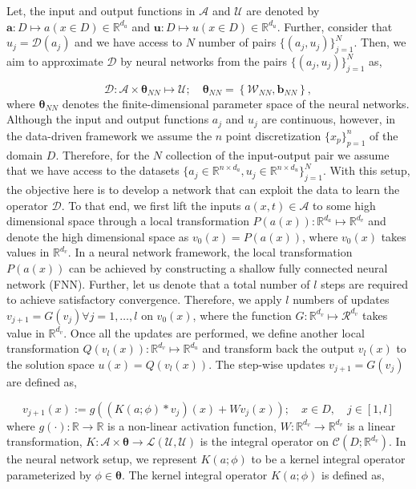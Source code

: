 \documentclass{article}
\begin{document}
Let, the input and output functions in $\mathcal{A}$ and $\mathcal{U}$ are denoted by ${\bm{a}} : D \mapsto a(x \in D) \in \mathbb{R}^{d_a}$ and ${\bm{u}}: D \mapsto u(x \in D) \in \mathbb{R}^{d_u}$. Further, consider that $u_j = \mathcal{D}(a_j)$ and we have access to $N$ number of pairs $\{(a_j, u_j)\}_{j=1}^N$. Then, we aim to approximate $\mathcal{D}$ by neural networks from the pairs $\{(a_j, u_j)\}_{j=1}^N$ as,

\begin{equation}
    \mathcal{D} : \mathcal{A} \times {\bm{\theta}}_{NN} \mapsto \mathcal{U}; \quad {\bm{\theta}_{NN}} = \left\{ \mathcal{W}_{NN}, {\bm{b}}_{NN} \right\},
\end{equation}
where ${\bm{\theta}_{NN}}$ denotes the finite-dimensional parameter space of the neural networks. 
Although the input and output functions $a_{j}$ and $u_{j}$ are continuous, however, in the data-driven framework we assume the $n$ point discretization $\{x_p\}_{p=1}^n$ of the domain $D$. Therefore, for the $N$ collection of the input-output pair we assume that we have access to the datasets $\{ a_{j} \in \mathbb{R}^{n \times d_{a}}, u_{j} \in \mathbb{R}^{n \times d_{u}} \}_{j=1}^N$. With this setup, the objective here is to develop a network that can exploit the data to learn the operator $\mathcal D$. To that end, 
we first lift the inputs $a(x,t) \in \mathcal{A}$ to some high dimensional space through a local transformation $P(a(x)): \mathbb{R}^{d_a} \mapsto \mathbb{R}^{d_v}$ and denote the high dimensional space as $v_{0}(x)=P(a(x))$, where $v_{0}(x)$ takes values in $\mathbb{R}^{d_v}$. In a neural network framework, the local transformation $P(a(x))$ can be achieved by constructing a shallow fully connected neural network (FNN). Further, let us denote that a total number of $l$ steps are required to achieve satisfactory convergence.
Therefore, we apply $l$ numbers of updates $v_{j+1} = G(v_{j}) \forall j=1,\ldots,l$ on $v_{0}(x)$, where the function $G: \mathbb{R}^{d_v} \mapsto \mathcal{R}^{d_v}$ takes value in $\mathbb{R}^{d_v}$. 
Once all the updates are performed, we define another local transformation $Q(v_{l}(x)): \mathbb{R}^{d_v} \mapsto \mathbb{R}^{d_u}$ and transform back the output $v_{l}(x)$ to the solution space $u(x)= Q\left(v_{l}(x)\right)$.
The step-wise updates $v_{j+1} = G(v_{j})$ are defined as, 

\begin{equation}\label{eq:iteration}
    v_{j+1}(x):= g \left( \left(K(a; \phi) * v_{j}\right)(x) + W v_{j}(x) \right); \quad x \in D, \quad j \in [1,l]
\end{equation}
where $g(\cdot): \mathbb{R} \to \mathbb{R}$ is a non-linear activation function, $W: \mathbb{R}^{d_{v}} \to \mathbb{R}^{d_{v}}$ is a linear transformation, $K: \mathcal{A} \times {\bm{\theta}} \to \mathcal{L}\left(\mathcal{U}, \mathcal{U}\right)$ is the integral operator on $\mathcal{C}\left(D ; \mathbb{R}^{d_{v}}\right)$.
In the neural network setup, we represent $K(a ; \phi)$ to be a kernel integral operator parameterized by $\phi \in {\bm{\theta}}$. The kernel integral operator $K(a ; \phi)$ is defined as,
\end{document}
